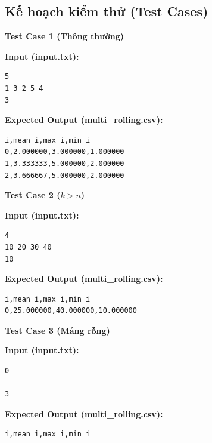 \subsection{Kế hoạch kiểm thử (Test Cases)}

\textbf{Test Case 1 (Thông thường)}

\textbf{Input (input.txt):}

\begin{lstlisting}
5
1 3 2 5 4
3
\end{lstlisting}

\textbf{Expected Output (multi\_rolling.csv):}

\begin{lstlisting}
i,mean_i,max_i,min_i
0,2.000000,3.000000,1.000000
1,3.333333,5.000000,2.000000
2,3.666667,5.000000,2.000000
\end{lstlisting}

\vspace{0.5cm}

\textbf{Test Case 2 (\(k > n\))}

\textbf{Input (input.txt):}

\begin{lstlisting}
4
10 20 30 40
10
\end{lstlisting}

\textbf{Expected Output (multi\_rolling.csv):}

\begin{lstlisting}
i,mean_i,max_i,min_i
0,25.000000,40.000000,10.000000
\end{lstlisting}

\vspace{0.5cm}

\textbf{Test Case 3 (Mảng rỗng)}

\textbf{Input (input.txt):}

\begin{lstlisting}
0

3
\end{lstlisting}

\textbf{Expected Output (multi\_rolling.csv):}

\begin{lstlisting}
i,mean_i,max_i,min_i
\end{lstlisting}